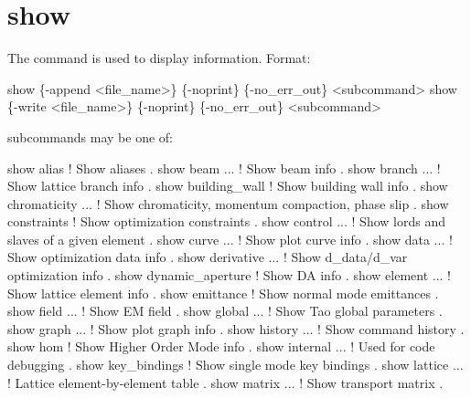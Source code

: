 {{{{{{{%

\section{show}
\label{s:show}

The  command is used to display information.
Format:
\begin{example}
  show \{-append <file_name>\} \{-noprint\} \{-no_err_out\} <subcommand>
  show \{-write <file_name>\} \{-noprint\} \{-no_err_out\} <subcommand>
\end{example}

 subcommands may be one of:
\begin{example}
  show alias                   ! Show aliases .
  show beam ...                ! Show beam info .
  show branch ...              ! Show lattice branch info .
  show building_wall           ! Show building wall info .
  show chromaticity ...        ! Show chromaticity, momentum compaction, phase slip .
  show constraints             ! Show optimization constraints .
  show control ...             ! Show lords and slaves of a given element .
  show curve ...               ! Show plot curve info .
  show data ...                ! Show optimization data info .
  show derivative ...          ! Show d_data/d_var optimization info .
  show dynamic_aperture        ! Show DA info .
  show element ...             ! Show lattice element info .
  show emittance               ! Show normal mode emittances .
  show field ...               ! Show EM field .
  show global ...              ! Show Tao global parameters .
  show graph ...               ! Show plot graph info .
  show history ...             ! Show command history .
  show hom                     ! Show Higher Order Mode info .
  show internal ...            ! Used for code debugging .
  show key_bindings            ! Show single mode key bindings .
  show lattice ...             ! Lattice element-by-element table .
  show matrix ...              ! Show transport matrix .

\end{example}}}}}}}}
